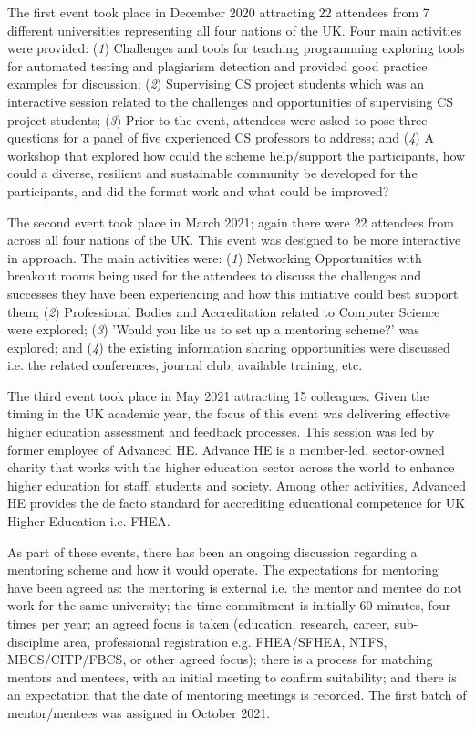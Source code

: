 \documentclass[sigconf]{acmart}
\begin{document}
The first event took place in December 2020 attracting 22 attendees
from 7 different universities representing all four nations of the
UK. Four main activities were provided: ({\emph{1}}) Challenges and
tools for teaching programming exploring tools for automated testing
and plagiarism detection and provided good practice examples for
discussion; ({\emph{2}}) Supervising CS project students which was an
interactive session related to the challenges and opportunities of
supervising CS project students; ({\emph{3}}) Prior to the event,
attendees were asked to pose three questions for a panel of five
experienced CS professors to address; and ({\emph{4}}) A workshop that
explored how could the scheme help/support the participants, how could
a diverse, resilient and sustainable community be developed for the
participants, and did the format work and what could be improved?

The second event took place in March 2021; again there were 22
attendees from across all four nations of the UK. This event was
designed to be more
interactive in approach. The main activities were: ({\emph{1}})
Networking Opportunities with breakout rooms being used for the
attendees to discuss the challenges and successes they have been
experiencing and how this initiative could best support them;
({\emph{2}}) Professional Bodies and Accreditation related to Computer
Science were explored; ({\emph{3}}) 'Would you like us to set up a
mentoring scheme?' was explored; and ({\emph{4}}) the existing
information sharing opportunities were discussed i.e. the related
conferences, journal club, available training, etc.

The third event took place in May 2021 attracting 15 colleagues. Given
the timing in the UK academic year, the focus of this event was
delivering effective higher education assessment and feedback
processes. This session was led by former employee of Advanced
HE. Advance HE is a member-led, sector-owned charity that works with
the higher education sector across the world to enhance higher
education for staff, students and society. Among other activities,
Advanced HE provides the de facto standard for accrediting educational
competence for UK Higher Education i.e. FHEA.

As part of these events, there has been an ongoing discussion
regarding a mentoring scheme and how it would operate. The
expectations for mentoring have been agreed as: the mentoring is
external i.e. the mentor and mentee do not work for the same
university; the time commitment is initially 60 minutes, four times
per year; an agreed focus is taken (education, research, career,
sub-discipline area, professional registration e.g. FHEA/SFHEA, NTFS,
MBCS/CITP/FBCS, or other agreed focus); there is a process for
matching mentors and mentees, with an initial meeting to confirm
suitability; and there is an expectation that the date of mentoring
meetings is recorded. The first batch of mentor/mentees was assigned
in October 2021.
\end{document}
